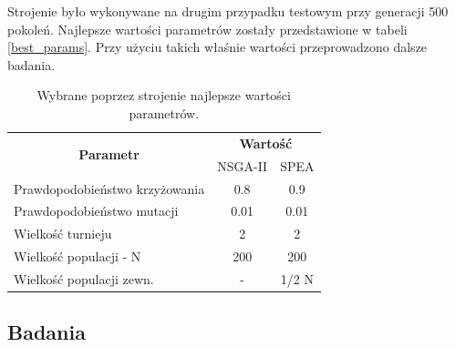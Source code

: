 \documentclass[twoside]{iisthesis}
\begin{document}
Strojenie było wykonywane na drugim przypadku testowym przy generacji 500 pokoleń. Najlepsze wartości parametrów zostały przedstawione w tabeli \eqref{best_params}. Przy użyciu takich właśnie wartości przeprowadzono dalsze badania.

\begin{table}[H]
\centering
\begin{tabular}{|l|c|c|}
\hline
\multicolumn{1}{|c|}{\multirow{2}{*}{\textbf{Parametr}}} & \multicolumn{2}{c|}{\textbf{Wartość}} \\ \cline{2-3} 
\multicolumn{1}{|c|}{}                                   & NSGA-II            & SPEA             \\ \hline
Prawdopodobieństwo krzyżowania                           & 0.8                & 0.9              \\ \hline
Prawdopodobieństwo mutacji                               & 0.01               & 0.01             \\ \hline
Wielkość turnieju                                        & 2                  & 2                \\ \hline
Wielkość populacji - N                                   & 200                & 200              \\ \hline
Wielkość populacji zewn.                                 & -                  & 1/2 N            \\ \hline
\end{tabular}
\caption{Wybrane poprzez strojenie najlepsze wartości parametrów.}
\label{best_params}
\end{table}

\subsection{Badania}
\end{document}
